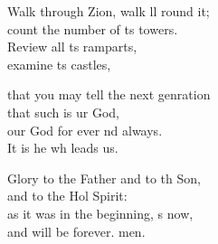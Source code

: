 \begin{psalmverse}
\begin{patverse}
Walk through Zion, walk ll round it;\Med\\
count the number of \pointup{\i}ts towers.\\
Review all \pointup{\i}ts ramparts,\Med\\
examine \pointup{\i}ts castles,

that you may tell the next genration\Med\\
that such is ur God,\\
our God for ever nd always.\Med\\
It is he wh leads us.

Glory to the Father and to th Son,\Med\\
and to the Hol Spirit:\\
as it was in the beginning, \pointup{\i}s now,\Med\\
and will be forever. men. 
  \end{patverse}
\end{psalmverse}
